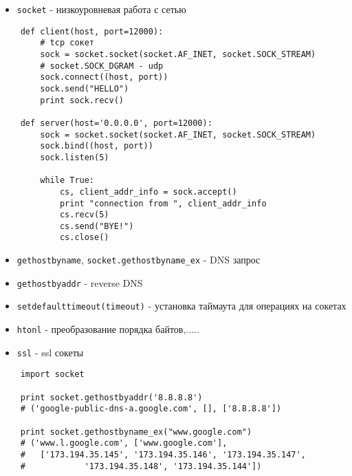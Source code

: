 \documentclass{article}
\begin{document}
\LARGE

\begin{itemize}
\item \lstinline!socket! - низкоуровневая работа с сетью
\end{itemize}
{
\Large \vspace{15pt}
\begin{lstlisting}
	def client(host, port=12000):
		# tcp сокет
		sock = socket.socket(socket.AF_INET, socket.SOCK_STREAM)
		# socket.SOCK_DGRAM - udp
		sock.connect((host, port))
		sock.send("HELLO")
		print sock.recv()

	def server(host='0.0.0.0', port=12000):
		sock = socket.socket(socket.AF_INET, socket.SOCK_STREAM)
		sock.bind((host, port))
		sock.listen(5)

		while True:
			cs, client_addr_info = sock.accept()
			print "connection from ", client_addr_info
			cs.recv(5)
			cs.send("BYE!")
			cs.close()
\end{lstlisting}
}
\newpage

\begin{itemize}
\item \lstinline!gethostbyname!, \lstinline!socket.gethostbyname_ex! - DNS запрос
\item \lstinline!gethostbyaddr! - reverse DNS
\item \lstinline!setdefaulttimeout(timeout)! - установка таймаута для операциях на сокетах
\item \lstinline!htonl! - преобразование порядка байтов,.....
\item \lstinline!ssl! - ssl сокеты
\end{itemize}

{
\vspace{15pt}
\begin{lstlisting}
	import socket
	
	print socket.gethostbyaddr('8.8.8.8')
	# ('google-public-dns-a.google.com', [], ['8.8.8.8'])

	print socket.gethostbyname_ex("www.google.com")
	# ('www.l.google.com', ['www.google.com'], 
	#	['173.194.35.145', '173.194.35.146', '173.194.35.147', 
	#            '173.194.35.148', '173.194.35.144'])

\end{lstlisting}
}

\newpage
\end{document}
